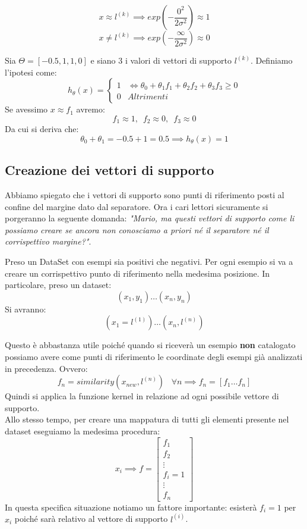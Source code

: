   \begin{nota}
  \[x \approx l^{(k)} \implies  exp\left(-\frac{0^2}{2\sigma^2}\right)  \approx 1\]
  \[x \neq l^{(k)} \implies  exp\left(-\frac{\infty}{2\sigma^2}\right)  \approx 0\]
  \end{nota}
\begin{esempio}
  Sia $\Theta = [-0.5, 1, 1, 0]$ e siano 3 i valori di vettori di supporto $l^{(k)}$. Definiamo l'ipotesi come:
  \[h_\theta(x) =
    \begin{cases}
      1& \iff \theta_0 + \theta_1f_1 + \theta_2f_2 + 
      \theta_3f_3 \geq 0 \\
      0& Altrimenti
    \end{cases}
  \]
  Se avessimo $x \approx f_1$ avremo:
  \[f_1 \approx 1,\,\,\,f_2 \approx 0,\,\,\,f_3 \approx 0\]
  Da cui si deriva che:
  \[\theta_0 + \theta_1 = -0.5+1 = 0.5 \implies h_\theta(x) = 1\]
\end{esempio}
\subsection{Creazione dei vettori di supporto}
Abbiamo spiegato che i vettori di supporto sono punti di riferimento posti al confine del margine dato dal separatore. Ora i cari lettori sicuramente si porgeranno la seguente domanda: \textit{"Mario, ma questi vettori di supporto come li possiamo creare se ancora non conosciamo a priori né il separatore né il corrispettivo margine?"}. 
\begin{definizione}
  Preso un DataSet con esempi sia positivi che negativi. Per ogni esempio si va a creare un corrispettivo punto di riferimento nella medesima posizione. In particolare, preso un dataset:
  \[{(x_1, y_1) \dots (x_n, y_n)}\]
  Si avranno:
  \[{(x_1 = l^{(1)}) \dots (x_n, l^{(n)})}\]
\end{definizione}
Questo è abbastanza utile poiché quando si riceverà un esempio \textbf{non} catalogato possiamo avere come punti di riferimento le coordinate degli esempi già analizzati in precedenza. Ovvero:
\[f_n = similarity(x_{new}, l^{(n)})\,\,\,\,\, \forall n \implies f_n = [f_1 \dots f_n]\]
Quindi si applica la funzione kernel in relazione ad ogni possibile vettore di supporto. \\ Allo stesso tempo, per creare una mappatura di tutti gli elementi presente nel dataset eseguiamo la medesima procedura:
\[x_i \implies 
    f = \begin{bmatrix}
           f_{1} \\
           f_{2} \\
           \vdots \\
           f_{i} = 1 \\
           \vdots \\
           f_{n}
         \end{bmatrix} \]
In questa specifica situazione notiamo un fattore importante: esisterà $f_{i} = 1$ per $x_i$ poiché sarà relativo al vettore di supporto $l^{(i)}$.
